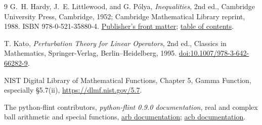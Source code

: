 \documentclass[11pt]{article}
\begin{document}
\begin{thebibliography}{9}
G.~H. Hardy, J.~E. Littlewood, and G. P\'olya,
\emph{Inequalities}, 2nd ed., Cambridge University Press, Cambridge,
1952; Cambridge Mathematical Library reprint, 1988.
ISBN 978-0-521-35880-4.
\href{https://assets.cambridge.org/97805213/58804/frontmatter/9780521358804_frontmatter.pdf}{Publisher's front matter};
\href{https://assets.cambridge.org/97805213/58804/toc/9780521358804_toc.pdf}{table of contents}.

T. Kato, \emph{Perturbation Theory for Linear Operators}, 2nd ed.,
Classics in Mathematics, Springer-Verlag, Berlin--Heidelberg, 1995.
\href{https://doi.org/10.1007/978-3-642-66282-9}{doi:10.1007/978-3-642-66282-9}.

NIST Digital Library of Mathematical Functions,
Chapter 5, Gamma Function, especially \S5.7(ii),
\href{https://dlmf.nist.gov/5.7}{https://dlmf.nist.gov/5.7}.

The python-flint contributors,
\emph{python-flint 0.9.0 documentation},
real and complex ball arithmetic and special functions,
\href{https://python-flint.readthedocs.io/en/stable/arb.html}{arb documentation};
\href{https://python-flint.readthedocs.io/en/stable/acb.html}{acb documentation}.
\end{thebibliography}
\end{document}
